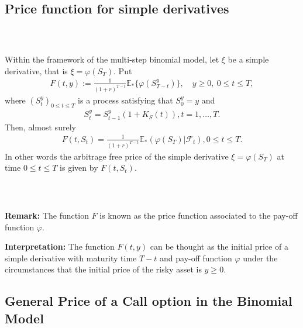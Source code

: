 \documentclass{beamer}
\numberwithin{equation}{section}
\begin{document}
\subsection{Price function for simple derivatives}

\begin{frame}\frametitle{{\normalsize \secname} \\ {\large \subsecname}}
    \begingroup
    \small
    \begin{theorem}\label{th:price_function}
        Within the framework of the multi-step binomial model, let $\xi$ be a simple derivative, that is $\xi = \varphi(S_T)$. 
        Put
        \begin{align}
            F(t,y) := \frac{1}{(1+r)^{T-t}} \mathbb{E}_* \{ \varphi (S_{T-t}^y) \}, \quad y \geq 0, \ 0 \leq t \leq T, 
        \end{align}
        where $(S_t^y)_{0 \leq t \leq T}$ is a process satisfying that $S_0^y = y$ and 
        \begin{align}
            S_t^y = S_{t-1}^y(1 + K_S(t)), t = 1, \ldots, T. 
        \end{align}
        Then, almost surely
        \begin{align}
            F(t, S_t) = \frac{1}{(1+r)^{T-t}} \mathbb{E}_* (\varphi(S_T) | \mathscr{F}_t), 0 \leq t \leq T. 
        \end{align}
        In other words the arbitrage free price of the simple derivative $\xi = \varphi(S_T)$ at time $0 \leq t \leq T$ is given by $F(t, S_t)$. 
    \end{theorem}
    \endgroup
\end{frame}

\begin{frame}\frametitle{{\normalsize \secname} \\ {\large \subsecname}}
    \textbf{Remark:} The function $F$ is known as the price function associated to the pay-off function $\varphi$. 
    \vspace{1cm}

    \textbf{Interpretation:} The function $F(t,y)$ can be thought as the initial price of a simple derivative with maturity time $T-t$ and pay-off function $\varphi$ under the circumstances that the initial price of the risky asset is $y \geq 0$. 
\end{frame}

\subsection{General Price of a Call option in the Binomial Model}
\end{document}

